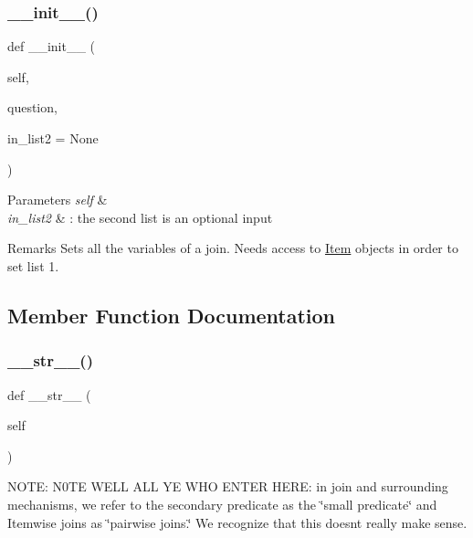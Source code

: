 \subsubsection{\texorpdfstring{\_\_init\_\_()}{\_\_init\_\_()}}
{\footnotesize\ttfamily def \+\_\+\+\_\+init\+\_\+\+\_\+ (\begin{DoxyParamCaption}\item[{}]{self,  }\item[{}]{question,  }\item[{}]{in\+\_\+list2 = {\ttfamily None} }\end{DoxyParamCaption})}


\begin{DoxyParams}{Parameters}
{\em self} & \\
\hline
{\em in\+\_\+list2} & \+: the second list is an optional input \\
\hline
\end{DoxyParams}
\begin{DoxyRemark}{Remarks}
Sets all the variables of a join. Needs access to \mbox{\hyperlink{classdynamicfilterapp_1_1models_1_1_item}{Item}} objects in order to set list 1. 
\end{DoxyRemark}


\subsection{Member Function Documentation}
\mbox{\label{classdynamicfilterapp_1_1models_1_1_join_a23e8041ce1015febe4fdace3225714f9}} 
\subsubsection{\texorpdfstring{\_\_str\_\_()}{\_\_str\_\_()}}
{\footnotesize\ttfamily def \+\_\+\+\_\+str\+\_\+\+\_\+ (\begin{DoxyParamCaption}\item[{}]{self }\end{DoxyParamCaption})}



N\+O\+TE\+: N0\+TE W\+E\+LL A\+LL YE W\+HO E\+N\+T\+ER H\+E\+RE\+: in join and surrounding mechanisms, we refer to the secondary predicate as the \char`\"{}small predicate\char`\"{} and Itemwise joins as \char`\"{}pairwise joins.\char`\"{} We recognize that this doesn\textquotesingle{}t really make sense. 

